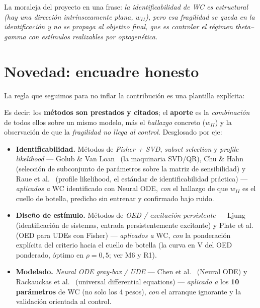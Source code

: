 \documentclass[11pt,a4paper]{article}
\begin{document}
La moraleja del proyecto en una frase: \emph{la identificabilidad de WC es
estructural (hay una dirección intrínsecamente plana, $w_{II}$), pero esa
fragilidad se queda en la identificación y no se propaga al objetivo final, que es
controlar el régimen theta--gamma con estímulos realizables por optogenética.}

\section{Novedad: encuadre honesto}

La regla que seguimos para no inflar la contribución es una plantilla explícita:

\begin{center}
\end{center}

Es decir: los \textbf{métodos son prestados y citados}; el \textbf{aporte} es la
\emph{combinación} de todos ellos sobre un mismo modelo, más el \emph{hallazgo}
concreto ($w_{II}$) y la observación de que la \emph{fragilidad no llega al
control}. Desglosado por eje:

\begin{itemize}[leftmargin=1.4em]
  \item \textbf{Identificabilidad.} Métodos de \emph{Fisher + SVD},
  \emph{subset selection} y \emph{profile likelihood} --- Golub \& Van
  Loan~\cite{golub2013} (la maquinaria SVD/QR), Chu \& Hahn~\cite{chuhahn2007}
  (selección de subconjunto de parámetros sobre la matriz de sensibilidad) y
  Raue et al.~\cite{raue2009} (profile likelihood, el estándar de
  identificabilidad práctica) --- \emph{aplicados a} WC identificado con Neural
  ODE, \emph{con} el hallazgo de que $w_{II}$ es el cuello de botella, predicho
  sin entrenar y confirmado bajo ruido.

  \item \textbf{Diseño de estímulo.} Métodos de \emph{OED / excitación
  persistente} --- Ljung~\cite{ljung1999} (identificación de sistemas, entrada
  persistentemente excitante) y Plate et al.~\cite{plate2024} (OED para UDEs con
  Fisher) --- \emph{aplicados a} WC, \emph{con} la ponderación explícita del
  criterio hacia el cuello de botella (la curva en V del OED ponderado, óptimo en
  $\rho=0{,}5$; ver M6 y R1).

  \item \textbf{Modelado.} \emph{Neural ODE gray-box / UDE} ---
  Chen et al.~\cite{chen2018} (Neural ODE) y Rackauckas et
  al.~\cite{rackauckas2020} (universal differential equations) --- \emph{aplicado
  a} los \textbf{10 parámetros} de WC (no solo los 4 pesos), \emph{con} el arranque
  ignorante y la validación orientada al control.
\end{itemize}
\end{document}
